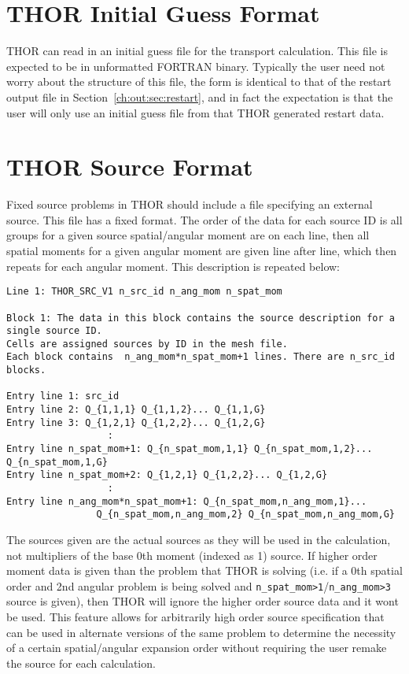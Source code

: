 \section{THOR Initial Guess Format}\label{ch:inp:sec:initguess}

\ac{THOR} can read in an initial guess file for the transport calculation.
This file is expected to be in unformatted FORTRAN binary.
Typically the user need not worry about the structure of this file, the form is identical to that of the restart output file in Section~\ref{ch:out:sec:restart}, and in fact the expectation is that the user will only use an initial guess file from that \ac{THOR} generated restart data.

\section{THOR Source Format}\label{ch:inp:sec:srcfile}

Fixed source problems in \ac{THOR} should include a file specifying an external source.
This file has a fixed format.
The order of the data for each source ID is all groups for a given source spatial/angular moment are on each line, then all spatial moments for a given angular moment are given line after line, which then repeats for each angular moment.
This description is repeated below:
\begin{verbatim}
Line 1: THOR_SRC_V1 n_src_id n_ang_mom n_spat_mom

Block 1: The data in this block contains the source description for a single source ID.
Cells are assigned sources by ID in the mesh file.
Each block contains  n_ang_mom*n_spat_mom+1 lines. There are n_src_id blocks.

Entry line 1: src_id
Entry line 2: Q_{1,1,1} Q_{1,1,2}... Q_{1,1,G}
Entry line 3: Q_{1,2,1} Q_{1,2,2}... Q_{1,2,G}
                  :
Entry line n_spat_mom+1: Q_{n_spat_mom,1,1} Q_{n_spat_mom,1,2}... Q_{n_spat_mom,1,G}
Entry line n_spat_mom+2: Q_{1,2,1} Q_{1,2,2}... Q_{1,2,G}
                  :
Entry line n_ang_mom*n_spat_mom+1: Q_{n_spat_mom,n_ang_mom,1}...
                Q_{n_spat_mom,n_ang_mom,2} Q_{n_spat_mom,n_ang_mom,G}
\end{verbatim}
The sources given are the actual sources as they will be used in the calculation, not multipliers of the base 0th moment (indexed as 1) source.
If higher order moment data is given than the problem that \ac{THOR} is solving (i.e. if a 0th spatial order and 2nd angular problem is being solved and \verb"n_spat_mom>1"/\verb"n_ang_mom>3" source is given), then \ac{THOR} will ignore the higher order source data and it wont be used.
This feature allows for arbitrarily high order source specification that can be used in alternate versions of the same problem to determine the necessity of a certain spatial/angular expansion order without requiring the user remake the source for each calculation.


